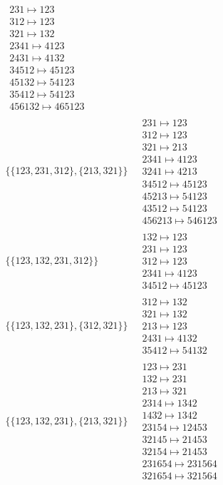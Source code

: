 \begin{scriptsize}
\begin{align}
\begin{matrix}
231 \mapsto 123\\312 \mapsto 123\\321 \mapsto 132\\2341 \mapsto 4123\\2431 \mapsto 4132\\34512 \mapsto 45123\\45132 \mapsto 54123\\35412 \mapsto 54123\\456132 \mapsto 465123
\end{matrix}
\\
\{\{123, 231, 312\}, \{213, 321\}\}
\ 
&
\begin{matrix}
231 \mapsto 123\\312 \mapsto 123\\321 \mapsto 213\\2341 \mapsto 4123\\3241 \mapsto 4213\\34512 \mapsto 45123\\45213 \mapsto 54123\\43512 \mapsto 54123\\456213 \mapsto 546123
\end{matrix}
\\
\{\{123, 132, 231, 312\}\}
\ 
&
\begin{matrix}
132 \mapsto 123\\231 \mapsto 123\\312 \mapsto 123\\2341 \mapsto 4123\\34512 \mapsto 45123
\end{matrix}
\\
\{\{123, 132, 231\}, \{312, 321\}\}
\ 
&
\begin{matrix}
312 \mapsto 132\\321 \mapsto 132\\213 \mapsto 123\\2431 \mapsto 4132\\35412 \mapsto 54132
\end{matrix}
\\
\{\{123, 132, 231\}, \{213, 321\}\}
\ 
&
\begin{matrix}
123 \mapsto 231\\132 \mapsto 231\\213 \mapsto 321\\2314 \mapsto 1342\\1432 \mapsto 1342\\23154 \mapsto 12453\\32145 \mapsto 21453\\32154 \mapsto 21453\\231654 \mapsto 231564\\321654 \mapsto 321564

\end{matrix}
\end{align}
\end{scriptsize}
